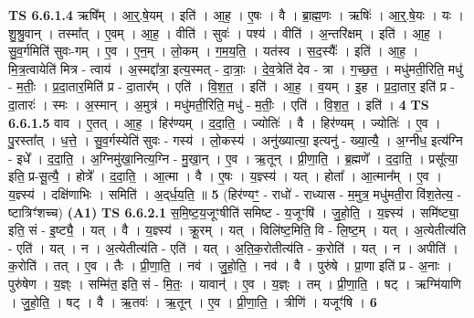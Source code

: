 \documentclass[17pt]{extarticle}
\begin{document}
                  \newline
                                \textbf{ TS 6.6.1.4} \newline
                  ऋषि᳚म् । आ॒र्॒.षे॒यम् । इति॑ । आ॒ह॒ । ए॒षः । वै । ब्रा॒ह्म॒णः । ऋषिः॑ । आ॒र्॒.षे॒यः । यः । शु॒श्रु॒वान् । तस्मा᳚त् । ए॒वम् । आ॒ह॒ । वीति॑ । सुवः॑ । पश्य॑ । वीति॑ । अ॒न्तरि॑क्षम् । इति॑ । आ॒ह॒ । सु॒व॒र्गमिति॑ सुवः-गम् । ए॒व । ए॒न॒म् । लो॒कम् । ग॒म॒य॒ति॒ । यत॑स्व । स॒द॒स्यैः᳚ । इति॑ । आ॒ह॒ । मि॒त्र॒त्वायेति॑ मित्र - त्वाय॑ । अ॒स्मद्दा᳚त्रा॒ इत्य॒स्मत् - दा॒त्राः॒ । दे॒व॒त्रेति॑ देव - त्रा । ग॒च्छ॒त॒ । मधु॑मती॒रिति॒ मधु॑ - म॒तीः॒ । प्र॒दा॒तार॒मिति॑ प्र - दा॒तार᳚म् । एति॑ । वि॒श॒त॒ । इति॑ । आ॒ह॒ । व॒यम् । इ॒ह । प्र॒दा॒तार॒ इति॑ प्र - दा॒तारः॑ । स्मः । अ॒स्मान् । अ॒मुत्र॑ । मधु॑मती॒रिति॒ मधु॑ - म॒तीः॒ । एति॑ । वि॒श॒त॒ । इति॑ । \textbf{  4} \newline
                  \newline
                                \textbf{ TS 6.6.1.5} \newline
                  वाव । ए॒तत् । आ॒ह॒ । हिर॑ण्यम् । द॒दा॒ति॒ । ज्योतिः॑ । वै । हिर॑ण्यम् । ज्योतिः॑ । ए॒व । पु॒रस्ता᳚त् । ध॒त्ते॒ । सु॒व॒र्गस्येति॑ सुवः - गस्य॑ । लो॒कस्य॑ । अनु॑ख्यात्या॒ इत्यनु॑ - ख्या॒त्यै॒ । अ॒ग्नीध॒ इत्य॑ग्नि - इधे᳚ । द॒दा॒ति॒ । अ॒ग्निमु॑खा॒नित्य॒ग्नि - मु॒खा॒न् । ए॒व । ऋ॒तून् । प्री॒णा॒ति॒ । ब्र॒ह्मणे᳚ । द॒दा॒ति॒ । प्रसू᳚त्या॒ इति॒ प्र-सू॒त्यै॒ । होत्रे᳚ । द॒दा॒ति॒ । आ॒त्मा । वै । ए॒षः । य॒ज्ञ्स्य॑ । यत् । होता᳚ । आ॒त्मान᳚म् । ए॒व । य॒ज्ञ्स्य॑ । दक्षि॑णाभिः । समिति॑ । अ॒द्‌र्ध॒य॒ति॒ ॥ \textbf{  5} \newline
                  \newline
                      (हिर॑ण्यꣳ॒॒ - राधो॑ - राध्यास - म॒मुत्र॒ मधु॑मती॒रा वि॑श॒तेत्य॒ - ष्टात्रिꣳ॑शच्च)  \textbf{(A1)} \newline \newline
                                \textbf{ TS 6.6.2.1} \newline
                  स॒मि॒ष्ट॒य॒जूꣳषीति॑ समिष्ट - य॒जूꣳषि॑ । जु॒हो॒ति॒ । य॒ज्ञ्स्य॑ । समि॑ष्ट्या॒ इति॒ सं - इ॒ष्ट्यै॒ । यत् । वै । य॒ज्ञ्स्य॑ । क्रू॒रम् । यत् । विलि॑ष्ट॒मिति॒ वि - लि॒ष्ट॒म् । यत् । अ॒त्येतीत्य॑ति - एति॑ । यत् । न । अ॒त्येतीत्य॑ति - एति॑ । यत् । अ॒ति॒क॒रोतीत्य॑ति - क॒रोति॑ । यत् । न । अपीति॑ । क॒रोति॑ । तत् । ए॒व । तैः । प्री॒णा॒ति॒ । नव॑ । जु॒हो॒ति॒ । नव॑ । वै । पुरु॑षे । प्रा॒णा इति॑ प्र - अ॒नाः । पुरु॑षेण । य॒ज्ञ्ः । सम्मि॑त॒ इति॒ सं - मि॒तः॒ । यावान्॑ । ए॒व । य॒ज्ञ्ः । तम् । प्री॒णा॒ति॒ । षट् । ऋग्मि॑याणि । जु॒हो॒ति॒ । षट् । वै । ऋ॒तवः॑ । ऋ॒तून् । ए॒व । प्री॒णा॒ति॒ । त्रीणि॑ । यजूꣳ॑षि । \textbf{  6} \newline
\end{document}
